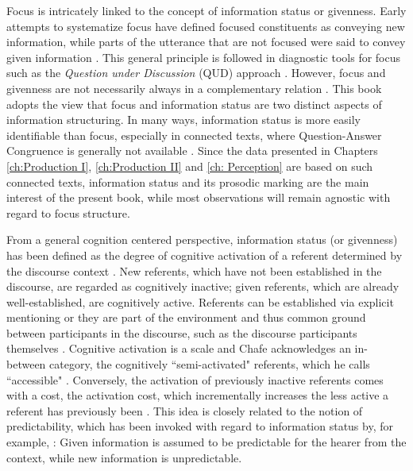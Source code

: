 Focus is intricately linked to the concept of information status or givenness. Early attempts to systematize focus have defined focused constituents as conveying new information, while parts of the utterance that are not focused were said to convey given information \citep[e.g.,][]{hallidayNotesTransitivityTheme1967, schwarzschildGivennessAvoidFOther1999}. This general principle is followed in diagnostic tools for focus such as the \textit{Question under Discussion} (QUD) approach \citep{riesterConstructingQUDTrees2019}. However, focus and givenness are not necessarily always in a complementary relation \citep{krifkaBasicNotionsInformation2008}. This book adopts the view that focus and information status are two distinct aspects of information structuring. In many ways, information status is more easily identifiable than focus, especially in connected texts, where Question-Answer Congruence is generally not available \citep[see discussion in][]{baumannBoostingInhibitingHow2024}. Since the data presented in Chapters \ref{ch:Production I}, \ref{ch:Production II} and \ref{ch: Perception} are based on such connected texts, information status and its prosodic marking are the main interest of the present book, while most observations will remain agnostic with regard to focus structure.

From a general cognition centered perspective, information status (or givenness) has been defined as the degree of cognitive activation of a referent determined by the discourse context \citep{chafeDiscourseConsciousnessTime1994}. New referents, which have not been established in the discourse, are regarded as cognitively inactive; given referents, which are already well-established, are cognitively active. Referents can be established via explicit mentioning or they are part of the environment and thus common ground between participants in the discourse, such as the discourse participants themselves \citep{chafeDiscourseConsciousnessTime1994}. Cognitive activation is a scale and Chafe acknowledges an in-between category, the cognitively ``semi-activated" referents, which he calls ``accessible" \citeyearpar[73]{chafeDiscourseConsciousnessTime1994}. Conversely, the activation of previously inactive referents comes with a cost, the activation cost, which incrementally increases the less active a referent has previously been \citep{chafeDiscourseConsciousnessTime1994}. This idea is closely related to the notion of predictability, which has been invoked with regard to information status by, for example, \citet{princeTaxonomyGivennewInformation1981}: Given information is assumed to be predictable for the hearer from the context, while new information is unpredictable.


